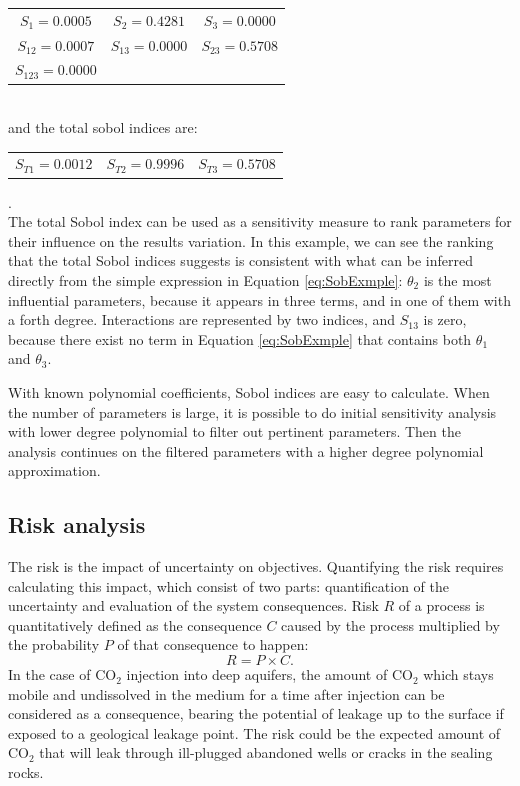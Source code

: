 \begin{tabular}{ccc}
$S_1=0.0005$ & $S_2=0.4281$ & $S_3=0.0000$ \\%
$S_{12}=0.0007$ &  $S_{13}=0.0000$ & $S_{23}=0.5708$\\ %
$S_{123}=0.0000$ & & %
\end{tabular}\\
and the total sobol indices are:\\
\begin{tabular}{ccc}
$S_{T1}= 0.0012$ & $S_{T2}= 0.9996$ & $S_{T3}= 0.5708$ 
\end{tabular}.\\ The total Sobol index can be used as a sensitivity
measure to rank parameters
for their influence on the results variation. In this example, we can see the ranking that the total Sobol indices suggests is consistent with what can
be inferred directly from the simple expression in Equation \ref{eq:SobExmple}:
$\theta_2$ is the most influential parameters, because it appears in three terms,
and in one of them with a forth degree. Interactions are represented by two
indices, and $S_{13}$ is zero, because there exist no term in Equation
\ref{eq:SobExmple} that contains both $\theta_1$ and $\theta_3$.

With known polynomial coefficients, Sobol indices are easy to calculate. When the number of parameters is large, it is possible to do initial sensitivity
analysis with lower degree polynomial to filter out pertinent parameters. Then
the analysis continues on the filtered parameters with a higher
degree polynomial approximation.

\subsection{Risk analysis}
\label{Section:RA}

The risk is the impact of uncertainty on objectives. Quantifying the risk
requires calculating this impact, which consist of two parts: quantification of
the uncertainty and evaluation of the system consequences. Risk $R$ of a process
is quantitatively defined as the consequence $C$
caused by the process multiplied by the probability $P$ of that consequence to
happen:
%
\begin{equation}
R=P\times C
\label{eq:rsk}.\end{equation}
%
In the case of $\mbox{CO}_{2}$ injection into deep aquifers, the amount of
$\mbox{CO}_{2}$ which stays mobile and undissolved in the medium for a time
after injection can be considered as a consequence, bearing the potential of
leakage up to the surface if exposed to a geological leakage point. The risk
could be the expected amount of $\mbox{CO}_{2}$ that will leak through
ill-plugged abandoned wells or cracks in the sealing rocks. 

